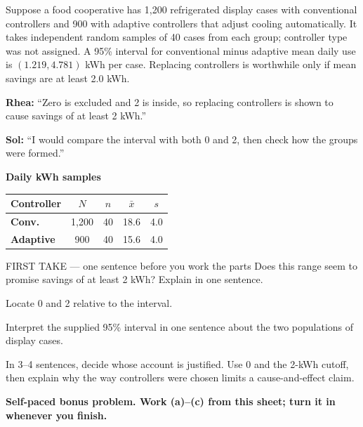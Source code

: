\documentclass[14pt]{extarticle}
\begin{document}
\pagestyle{empty}


\noindent\begin{minipage}[t]{0.57\linewidth}
\vspace{0pt}
Suppose a food cooperative has 1{,}200 refrigerated display cases with conventional controllers and 900 with adaptive controllers that adjust cooling automatically. It takes independent random samples of 40 cases from each group; controller type was not assigned. A 95\% interval for conventional minus adaptive mean daily use is $(1.219,4.781)$ kWh per case. Replacing controllers is worthwhile only if mean savings are at least 2.0 kWh.\par\smallskip \textbf{Rhea:} ``Zero is excluded and 2 is inside, so replacing controllers is shown to cause savings of at least 2 kWh.''\par \textbf{Sol:} ``I would compare the interval with both 0 and 2, then check how the groups were formed.''\par
\end{minipage}\hfill
\begin{minipage}[t]{0.40\linewidth}
\vspace{0pt}
\begin{center}
\textbf{Daily kWh samples}\par\smallskip
\begin{tabular}{|l|c|c|c|c|}
\hline
\textbf{Controller} & \textbf{$N$} & \textbf{$n$} & \textbf{$\bar x$} & \textbf{$s$} \\ \hline
\textbf{Conv.} & 1,200 & 40 & 18.6 & 4.0 \\ \hline
\textbf{Adaptive} & 900 & 40 & 15.6 & 4.0 \\ \hline
\end{tabular}
\end{center}
\end{minipage}

\begin{firsttakebox}{FIRST TAKE --- one sentence before you work the parts}
Does this range seem to promise savings of at least 2 kWh? Explain in one sentence.
\end{firsttakebox}

\begin{description}[leftmargin=1.15in, labelwidth=1in, itemsep=2pt, topsep=2pt]
  \item[\dokbadge{1}~(a)] Locate 0 and 2 relative to the interval.
  \item[\dokbadge{2}~(b)] Interpret the supplied 95\% interval in one sentence about the two populations of display cases.
  \item[\dokbadge{3}~(c)] In 3--4 sentences, decide whose account is justified. Use 0 and the 2-kWh cutoff, then explain why the way controllers were chosen limits a cause-and-effect claim.
\end{description}

\vfill
\textbf{Self-paced bonus problem. Work (a)--(c) from this sheet; turn it in whenever you finish.}
\end{document}
